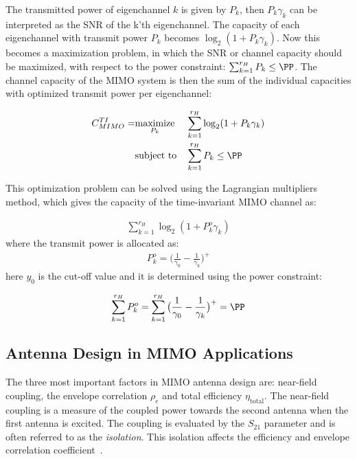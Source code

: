 The transmitted power of eigenchannel $k$ is given by $P_k$, then $P_k\gamma_k$ can be interpreted as the SNR of the k'th eigenchannel. The capacity of each eigenchannel with transmit power $P_k$ becomes $\log_2 (1 + P_k\gamma_k)$. Now this becomes a maximization problem, in which the SNR or channel capacity should be maximized, with respect to the power constraint: $\sum_{k=1}^{r_H} P_k \leq \PP$. 
The channel capacity of the MIMO system is then the sum of the individual capacities with optimized transmit power per eigenchannel: 


\begin{equation*}
\begin{aligned}
C^{TI}_{MIMO} = 
& \underset{P_k}{\text{maximize}}
& & \sum_{k=1}^{r_H} \log_2 (1 + P_k\gamma_k) \\
& \text{subject to}
& & \sum_{k=1}^{r_H} P_k \leq \PP
\end{aligned}
\end{equation*}

This optimization problem can be solved using the Lagrangian multipliers method, which gives the capacity of the time-invariant MIMO channel as\cite{Tim2012Practical}: 

\begin{align*}
  \sum_{k=1}^{r_H} \log_2 (1 + P^o_k\gamma_k)
\end{align*}
where the transmit power is allocated as: 
\begin{align*}
  P_k^o = \big(\frac{1}{\gamma_0} - \frac{1}{\gamma_k}\big)^+ 
\end{align*}
here $y_0$ is the cut-off value and it is determined using the power constraint: 

\begin{align*}
  \sum_{k=1}^{r_H} P_k^o = \sum_{k=1}^{r_H} \big(\frac{1}{\gamma_0} - \frac{1}{\gamma_k}\big)^+ = \PP
\end{align*}

\subsection{Antenna Design in MIMO Applications}
The three most important factors in MIMO antenna design are: near-field coupling, the envelope correlation $\rho_e$ and total efficiency $\eta_{\text{total}}$. The near-field coupling is a measure of the coupled power towards the second antenna when the first antenna is excited. The coupling is evaluated by the $S_{21}$ parameter and is often referred to as the \emph{isolation}. This isolation affects the efficiency and envelope correlation coefficient~\cite{Tatomirescu2011PortIsolation}. 


